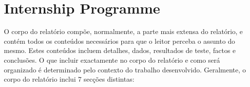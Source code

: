 

\chapter{Internship Programme}
\label{ch:desenvolvimento}


O corpo do relatório compõe, normalmente, a parte mais extensa do relatório, e contém todos os conteúdos necessários para que o leitor perceba o assunto do mesmo. Estes conteúdos incluem detalhes, dados, resultados de teste, factos e conclusões. O que incluir exactamente no corpo do relatório e como será organizado é determinado pelo contexto do trabalho desenvolvido. Geralmente, o corpo do relatório inclui 7 secções distintas:

